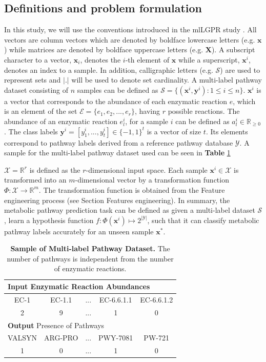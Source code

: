 \documentclass[sn-mathphys,Numbered]{sn-jnl}%
\theoremstyle{thmstyleone}%
\theoremstyle{thmstyletwo}%
\theoremstyle{thmstylethree}%
\begin{document}
\subsection{Definitions and problem formulation}
In this study, we will use the conventions introduced in the mlLGPR study \cite{m.a.basherMetabolicPathwayInference2020}. 
All vectors are column vectors which are denoted by boldface lowercase letters (e.g. $\textbf{x}$) while matrices are denoted by boldface uppercase letters (e.g. $\textbf{X}$). 
A subscript character to a vector, $\textbf{x}_i$, denotes the $i$-th element of $\textbf{x}$ while a superscript, $\textbf{x}^{i}$, denotes an index to a sample. 
In addition, calligraphic letters (e.g. $\mathcal{S}$) are used to represent sets and $|.|$ will be used to denote set cardinality.
A multi-label pathway dataset consisting of $n$ samples can be defined as $\mathcal{S} = \{ (\textbf{x}^{i},\textbf{y}^{i}) : 1 \leqslant i \leqslant n \}$. 
$\textbf{x}^i$ is a vector that corresponds to the abundance of each enzymatic reaction $e$, which is an element of the set $\mathcal{E}=\{e_1,e_2,...,e_r\}$, having $r$ possible reactions. 
The abundance of an enzymatic reaction $e_l^{i}$, for a sample $i$ can be defined as $a_l^{i}\in \mathbb{R}_{\ge0}$.
The class labels $\textbf{y}^{i}=[y_1^{i},...,y_t^{i}]\in\{-1,1\}^t$ is a vector of size $t$. 
Its elements correspond to pathway labels derived from a reference pathway database $\mathcal{Y}$.
A sample for the multi-label pathway dataset used can be seen in \textbf{Table} \ref{table:1}

$\mathcal{X}=\mathbb{R}^r$ is defined as the $r$-dimensional input space. 
Each sample $\textbf{x}^{i} \in \mathcal{X}$ is transformed into an $m$-dimensional vector by a transformation function $\Phi:\mathcal{X} \rightarrow \mathbb{R}^m$. 
The transformation function is obtained from the Feature engineering process (see Section Features engineering). 
In summary, the metabolic pathway prediction task can be defined as given a multi-label dataset $\mathcal{S}$, learn a hypothesis function $f : \Phi(\textbf{x}^{i})\mapsto 2^{|\mathcal{Y}|}$, such that it can classify metabolic pathway labels accurately for an unseen sample $\textbf{x}^*$.

\begin{table}[hb]
\caption{\textbf{Sample of Multi-label Pathway Dataset.} The number of pathways is independent from the number of enzymatic reactions.}
\label{table:1}
\begin{tabular}{|c | c | c | c | c|}
 \hline
 \multicolumn{5}{|l|}{\textbf{Input} Enzymatic Reaction Abundances}\\
 \hline
 EC-1&EC-1.1&...&EC-6.6.1.1&EC-6.6.1.2\\
 \hline
 2&9&...&1&0\\
 \hline
 \multicolumn{5}{|l|}{\textbf{Output} Presence of Pathways}\\
 \hline
 VALSYN&ARG-PRO&...&PWY-7081&PW-721\\
 \hline
 1&0&...&1&0\\
 \hline
\end{tabular}
\end{table}
\end{document}

